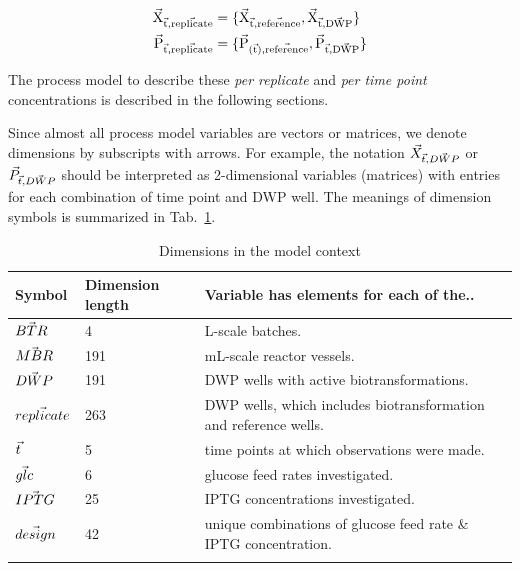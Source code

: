 \documentclass[sn-standardnature]{sn-jnl}%
\def\vec{\mathaccent "017E\relax }
\theoremstyle{thmstyleone}%
\theoremstyle{thmstyletwo}%
\theoremstyle{thmstylethree}%
\begin{document}
\begin{equation}
\begin{aligned}
    \mathrm{\vec{X}_{\vec{t},\vec{replicate}}} &= \{ \mathrm{\vec{X}_{\vec{t},\vec{reference}}}, \mathrm{\vec{X}_{\vec{t},\vec{DWP}}}\} \\
    \mathrm{\vec{P}_{\vec{t},\vec{replicate}}} &= \{ \mathrm{\vec{P}_{(\vec{t}),\vec{reference}}}, \mathrm{\vec{P}_{\vec{t},\vec{DWP}}}\} \\
\end{aligned}
\label{eq_XandP}
\end{equation}

The process model to describe these \textit{per replicate} and \textit{per time point} concentrations is described in the following sections.

Since almost all process model variables are vectors or matrices, we denote dimensions by subscripts with arrows.
For example, the notation $\vec{X}_{\vec{t},\vec{DWP}}$ or $\vec{P}_{\vec{t},\vec{DWP}}$ should be interpreted as 2-dimensional variables (matrices) with entries for each combination of time point and DWP well.
The meanings of dimension symbols is summarized in Tab.~\ref{tab_dimensions}.


\begin{table}[h]
    \begin{center}
    \begin{minipage}{\textwidth}
    \caption{Dimensions in the model context}
    \label{tab_dimensions}
    \begin{tabular}{@{}lll@{}}
\toprule
Symbol & Dimension length & Variable has elements for each of the..\\
\midrule
$\vec{BTR}$ & 4 & L-scale batches.\\
$\vec{MBR}$ & 191 & mL-scale reactor vessels.\\
$\vec{DWP}$ & 191 & DWP wells with active biotransformations.\\
$\vec{replicate}$ & 263 & DWP wells, which includes biotransformation and reference wells.\\
$\vec{t}$ & 5 & time points at which observations were made.\\
$\vec{glc}$ & 6 & glucose feed rates investigated.\\
$\vec{IPTG}$ & 25 & IPTG concentrations investigated.\\
$\vec{design}$ & 42 & unique combinations of glucose feed rate \& IPTG concentration.\\
\botrule
    \end{tabular}
    \end{minipage}
    \end{center}
\end{table}
\end{document}
